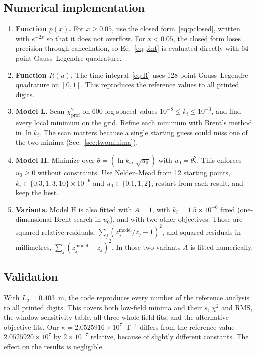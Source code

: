 \documentclass[11pt,a4paper]{article}
\begin{document}
\subsection{Numerical implementation}
\begin{enumerate}
\item \textbf{Function $p(x)$.} For $x\ge 0.05$, use the closed form~\eqref{eq:pclosed}, written with $e^{-2x}$ so that it does not overflow. For $x<0.05$, the closed form loses precision through cancellation, so Eq.~\eqref{eq:pint} is evaluated directly with 64-point Gauss--Legendre quadrature.
\item \textbf{Function $R(u)$.} The time integral~\eqref{eq:R} uses 128-point Gauss--Legendre quadrature on $[0,1]$. This reproduces the reference values to all printed digits.
\item \textbf{Model L.} Scan $\chi^2_\text{prof}$ on 600 log-spaced values $10^{-8}\le k_i\le10^{-3}$, and find every local minimum on the grid. Refine each minimum with Brent's method in $\ln k_i$. The scan matters because a single starting guess could miss one of the two minima (Sec.~\ref{sec:twominima}).
\item \textbf{Model H.} Minimize over $\theta = (\ln k_i,\ \sqrt{u_0})$ with $u_0 = \theta_2^2$. This enforces $u_0\ge 0$ without constraints. Use Nelder--Mead from 12 starting points, $k_i\in\{0.3,1,3,10\}\times10^{-6}$ and $u_0\in\{0.1,1,2\}$, restart from each result, and keep the best.
\item \textbf{Variants.} Model H is also fitted with $A=1$, with $k_i = 1.5\times10^{-6}$ fixed (one-dimensional Brent search in $u_0$), and with two other objectives. Those are squared relative residuals, $\sum_j(z^\text{model}_j/z_j-1)^2$, and squared residuals in millimetres, $\sum_j(z^\text{model}_j-z_j)^2$. In those two variants $A$ is fitted numerically.
\end{enumerate}

\subsection{Validation}
With $L_2 = 0.403$~m, the code reproduces every number of the reference analysis~\cite{wang2026} to all printed digits. This covers both low-field minima and their $s$, $\chi^2$ and RMS, the window-sensitivity table, all three whole-field fits, and the alternative-objective fits. Our $\kappa = 2.0525916\times10^7$~T$^{-1}$ differs from the reference value $2.0525920\times10^7$ by $2\times10^{-7}$ relative, because of slightly different constants. The effect on the results is negligible.
\end{document}
